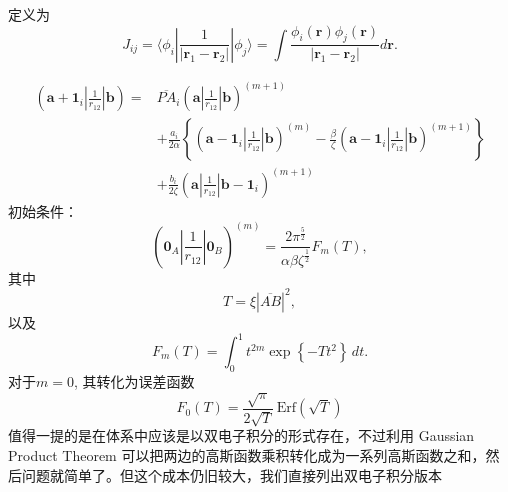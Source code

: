 \documentclass[12pt,a4paper,openany,twoside]{article}
\numberwithin{equation}{section}
\begin{document}
                定义为
                \begin{equation}
                    J_{ij} = \langle \phi_i | \frac{1}{|\boldsymbol{r}_1 - \boldsymbol{r}_2|} |\phi_j \rangle = \int \frac{\phi_i(\boldsymbol{r}) \phi_j(\boldsymbol{r})}{|\boldsymbol{r}_1 - \boldsymbol{r}_2|} d \boldsymbol{r}. 
                \end{equation}
                
                \begin{equation}
                    \begin{aligned}
                    ( \boldsymbol{a} + \boldsymbol{1}_i | \frac{1}{r_{12}} | \boldsymbol{b} ) =  & \overline{PA}_i ( \boldsymbol{a} | \frac{1}{r_{12}} | \boldsymbol{b} ) ^{(m+1)} \\
                    & + \frac{a_i}{2\alpha} \left\{ ( \boldsymbol{a}-\boldsymbol{1}_i | \frac{1}{r_{12}} | \boldsymbol{b} ) ^{(m)} - \frac{\beta}{\zeta}( \boldsymbol{a} - \boldsymbol{1}_i | \frac{1}{r_{12}} | \boldsymbol{b} ) ^{(m+1)}\right\}\\
                    & + \frac{b_i}{2\zeta} ( \boldsymbol{a} | \frac{1}{r_{12}} | \boldsymbol{b} - \boldsymbol{1}_i ) ^{(m+1)} 
                    \end{aligned}
                \end{equation}
                初始条件：
                \begin{equation}
                    ( \boldsymbol{0}_A | \frac{1}{r_{12}} | \boldsymbol{0}_B ) ^{(m)} = \frac{2\pi ^{\frac{5}{2}}}{\alpha \beta \zeta^\frac{1}{2}} F_m(T)
                ,\end{equation}
                其中
                \begin{equation}
                    T = \xi |\overline{AB}| ^2
                ,\end{equation}
                以及
                \begin{equation}
                    F_m (T) = \int ^1_0 t^{2m} \exp \left\{ - T t^2 \right\}  \, dt 
                .\end{equation}
                对于$m=0$,  其转化为误差函数
                \begin{equation}
                    F_0(T) = \frac{\sqrt{\pi}}{2\sqrt{T}} \,\mathrm{Erf}\left(\sqrt{T}\right)
                \end{equation}
                值得一提的是在体系中应该是以双电子积分的形式存在，不过利用 Gaussian Product Theorem 可以把两边的高斯函数乘积转化成为一系列高斯函数之和，然后问题就简单了。但这个成本仍旧较大，我们直接列出双电子积分版本\cite{obara1986efficient}
\end{document}
